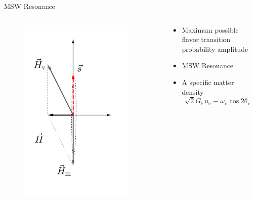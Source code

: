 \begin{frame}{MSW Resonance}


\begin{columns}[T]
\begin{column}{0.5\textwidth}



\begin{figure}
    \centering
    \colorbox{white}{\includegraphics[width=0.9\textwidth]{assets/matter-effect-critical-density}}
\end{figure}


\end{column}%
\begin{column}{0.5\textwidth}



\begin{itemize}
\item
Maximum possible flavor transition probability amplitude
\item
MSW Resonance
\item
A specific matter density
\begin{equation*}
    \sqrt{2}G_{\mathrm F}n_{\mathrm e} \equiv \omega_{\mathrm v}\cos 2\theta_{\mathrm v}
\end{equation*}



\end{itemize}
\end{column}
\end{columns}
\end{frame}
